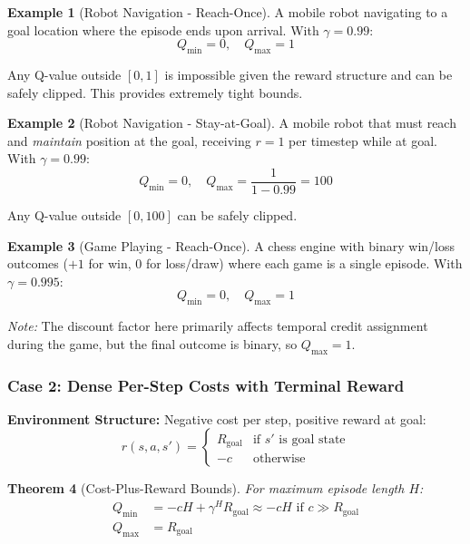 \documentclass[11pt]{article}
\newtheorem{theorem}{Theorem}
\theoremstyle{definition}
\newtheorem{example}[theorem]{Example}
\theoremstyle{remark}
\begin{document}
\begin{example}[Robot Navigation - Reach-Once]
A mobile robot navigating to a goal location where the episode ends upon arrival. With $\gamma = 0.99$:
$$Q_{\min} = 0, \quad Q_{\max} = 1$$

Any Q-value outside $[0, 1]$ is impossible given the reward structure and can be safely clipped. This provides extremely tight bounds.
\end{example}

\begin{example}[Robot Navigation - Stay-at-Goal]
A mobile robot that must reach and \textit{maintain} position at the goal, receiving $r=1$ per timestep while at goal. With $\gamma = 0.99$:
$$Q_{\min} = 0, \quad Q_{\max} = \frac{1}{1-0.99} = 100$$

Any Q-value outside $[0, 100]$ can be safely clipped.
\end{example}

\begin{example}[Game Playing - Reach-Once]
A chess engine with binary win/loss outcomes ($+1$ for win, $0$ for loss/draw) where each game is a single episode. With $\gamma = 0.995$:
$$Q_{\min} = 0, \quad Q_{\max} = 1$$

\textit{Note:} The discount factor here primarily affects temporal credit assignment during the game, but the final outcome is binary, so $Q_{\max} = 1$.
\end{example}

\subsubsection{Case 2: Dense Per-Step Costs with Terminal Reward}

\textbf{Environment Structure:} Negative cost per step, positive reward at goal:
$$r(s,a,s') = \begin{cases} 
R_{\text{goal}} & \text{if } s' \text{ is goal state} \\ 
-c & \text{otherwise}
\end{cases}$$

\begin{theorem}[Cost-Plus-Reward Bounds]
For maximum episode length $H$:
\begin{align}
Q_{\min} &= -cH + \gamma^H R_{\text{goal}} \approx -cH \text{ if } c \gg R_{\text{goal}} \\
Q_{\max} &= R_{\text{goal}}
\end{align}
\end{theorem}
\end{document}
